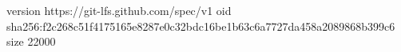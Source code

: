 version https://git-lfs.github.com/spec/v1
oid sha256:f2c268c51f4175165e8287e0c32bdc16be1b63c6a7727da458a2089868b399c6
size 22000
